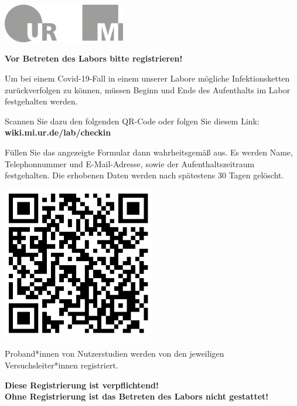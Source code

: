 \documentclass[24pt, a4paper, portrait]{article}
\begin{document}
\pagestyle{empty}

\raggedleft

\includegraphics[width=0.4\textwidth]{logo}

\vspace{1cm}
\sffamily
\centering
\huge

\textbf{Vor Betreten des Labors bitte registrieren!}

\vspace{1cm}

\raggedright
\Large

Um bei einem Covid-19-Fall in einem unserer Labore mögliche Infektionsketten zurückverfolgen zu können, müssen Beginn und Ende des Aufenthalts im Labor festgehalten werden.

\medskip

Scannen Sie dazu den folgenden QR-Code oder folgen Sie diesem Link: \textbf{wiki.mi.ur.de/lab/checkin}

\medskip

Füllen Sie das angezeigte Formular dann wahrheitsgemäß aus.
Es werden Name, Telephonnummer und E-Mail-Adresse, sowie der Aufenthaltszeitraum festgehalten.
Die erhobenen Daten werden nach spätestens 30 Tagen gelöscht.

\vspace{1cm}
\centering
\includegraphics[width=0.5\textwidth]{qr/vr4_labor_checkin}

\vspace{1cm}
\raggedright
Proband*innen von Nutzerstudien werden von den jeweiligen Versuchsleiter*innen registriert.

\vspace{1cm}
\centering
\huge
\textbf{Diese Registrierung ist verpflichtend! \\ Ohne Registrierung ist das Betreten des Labors nicht gestattet!}
\end{document}
